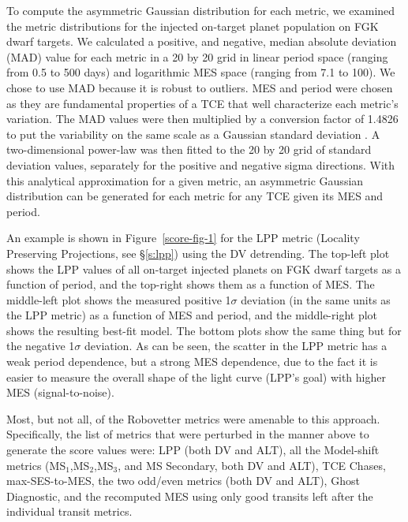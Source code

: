 To compute the asymmetric Gaussian distribution for each metric, we examined the metric distributions for the injected on-target planet population on FGK dwarf targets. We calculated a positive, and negative, median absolute deviation (MAD) value for each metric in a 20 by 20 grid in linear period space (ranging from 0.5 to 500 days) and logarithmic MES space (ranging from 7.1 to 100). We chose to use MAD because it is robust to outliers. MES and period were chosen as they are fundamental properties of a TCE that well characterize each metric's variation. The MAD values were then multiplied by a conversion factor of 1.4826 to put the variability on the same scale as a Gaussian standard deviation \citep{Hampel1974,Ruppert2010}. A two-dimensional power-law was then fitted to the 20 by 20 grid of standard deviation values, separately for the positive and negative sigma directions. With this analytical approximation for a given metric, an asymmetric Gaussian distribution can be generated for each metric for any TCE given its MES and period.

An example is shown in Figure~\ref{score-fig-1} for the LPP metric (Locality Preserving Projections, see \S\ref{s:lpp}) using the DV detrending. The top-left plot shows the LPP values of all on-target injected planets on FGK dwarf targets as a function of period, and the top-right shows them as a function of MES. The middle-left plot shows the measured positive 1$\sigma$ deviation (in the same units as the LPP metric) as a function of MES and period, and the middle-right plot shows the resulting best-fit model. The bottom plots show the same thing but for the negative 1$\sigma$ deviation. As can be seen, the scatter in the LPP metric has a weak period dependence, but a strong MES dependence, due to the fact it is easier to measure the overall shape of the light curve (LPP's goal) with higher MES (signal-to-noise). 

Most, but not all, of the Robovetter metrics were amenable to this approach. Specifically, the list of metrics that were perturbed in the manner above to generate the score values were: LPP (both DV and ALT), all the Model-shift metrics (MS$_1$,MS$_2$,MS$_3$, and MS Secondary, both DV and ALT), TCE Chases, max-SES-to-MES, the two odd/even metrics (both DV and ALT), Ghost Diagnostic, and the recomputed MES using only good transits left after the individual transit metrics.

